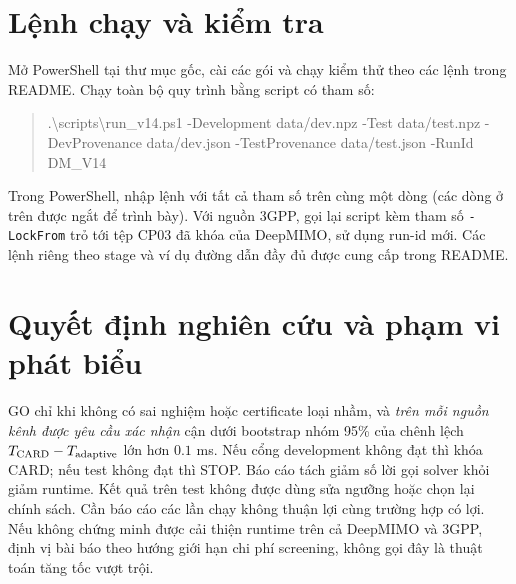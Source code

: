 \documentclass[11pt,onecolumn]{IEEEtran}
\begin{document}
\section{Lệnh chạy và kiểm tra}
Mở PowerShell tại thư mục gốc, cài các gói và chạy kiểm thử theo các lệnh trong README. Chạy toàn bộ quy trình bằng script có tham số:
\begin{quote}\small\ttfamily
.\textbackslash scripts\textbackslash run\_v14.ps1\newline
\hspace*{3mm}-Development data/dev.npz\newline
\hspace*{3mm}-Test data/test.npz\newline
\hspace*{3mm}-DevProvenance data/dev.json\newline
\hspace*{3mm}-TestProvenance data/test.json\newline
\hspace*{3mm}-RunId DM\_V14\newline
\end{quote}
Trong PowerShell, nhập lệnh với tất cả tham số trên cùng một dòng (các dòng ở trên được ngắt để trình bày). Với nguồn 3GPP, gọi lại script kèm tham số \texttt{-LockFrom} trỏ tới tệp CP03 đã khóa của DeepMIMO, sử dụng run-id mới. Các lệnh riêng theo stage và ví dụ đường dẫn đầy đủ được cung cấp trong README.

\section{Quyết định nghiên cứu và phạm vi phát biểu}
GO chỉ khi không có sai nghiệm hoặc certificate loại nhầm, và \emph{trên mỗi nguồn kênh được yêu cầu xác nhận} cận dưới bootstrap nhóm 95\% của chênh lệch $T_{\rm CARD}-T_{\rm adaptive}$ lớn hơn $0.1$ ms. Nếu cổng development không đạt thì khóa CARD; nếu test không đạt thì STOP. Báo cáo tách giảm số lời gọi solver khỏi giảm runtime. Kết quả trên test không được dùng sửa ngưỡng hoặc chọn lại chính sách. Cần báo cáo các lần chạy không thuận lợi cùng trường hợp có lợi. Nếu không chứng minh được cải thiện runtime trên cả DeepMIMO và 3GPP, định vị bài báo theo hướng giới hạn chi phí screening, không gọi đây là thuật toán tăng tốc vượt trội.
\end{document}
